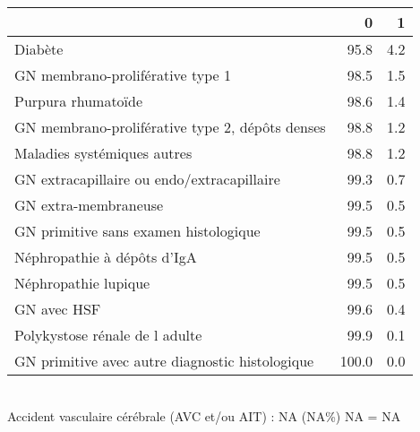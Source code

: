 \documentclass[11pt,a4paper]{article}\usepackage[]{graphicx}\usepackage[]{color}
\begin{document}
\begin{table}[H]
\centering
\begin{tabular}{lrr}
  \hline
 & 0 & 1 \\ 
  \hline
Diabète & 95.8 & 4.2 \\ 
  GN membrano-proliférative type 1 & 98.5 & 1.5 \\ 
  Purpura rhumatoïde & 98.6 & 1.4 \\ 
  GN membrano-proliférative type 2, dépôts denses & 98.8 & 1.2 \\ 
  Maladies systémiques autres & 98.8 & 1.2 \\ 
  GN extracapillaire ou endo/extracapillaire & 99.3 & 0.7 \\ 
  GN extra-membraneuse & 99.5 & 0.5 \\ 
  GN primitive sans examen histologique & 99.5 & 0.5 \\ 
  Néphropathie à dépôts d'IgA & 99.5 & 0.5 \\ 
  Néphropathie lupique & 99.5 & 0.5 \\ 
  GN avec HSF & 99.6 & 0.4 \\ 
  Polykystose rénale de l adulte & 99.9 & 0.1 \\ 
  GN primitive avec autre diagnostic histologique & 100.0 & 0.0 \\ 
   \hline
\end{tabular}
\end{table}

~\\

Accident vasculaire cérébrale (AVC et/ou AIT) : NA (NA\%) NA = NA
\end{document}
